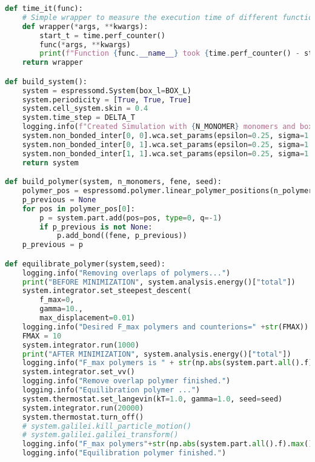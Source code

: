 \begin{lstlisting}[language=python]
def time_it(func):
	# Simple wrapper to measure the execution time of different functions.
	def wrapper(*args, **kwargs):
		start_t = time.perf_counter()
		func(*args, **kwargs)
		print(f"Function {func.__name__} took {time.perf_counter() - start_t:.2f}s to execute.")
	return wrapper

def build_system():
	system = espressomd.System(box_l=BOX_L)
	system.periodicity = [True, True, True]
	system.cell_system.skin = 0.4
	system.time_step = DELTA_T
	logging.info(f"Created Simulation with {N_MONOMER} monomers and box length L={BOX_L}.")
	system.non_bonded_inter[0, 0].wca.set_params(epsilon=0.25, sigma=1.0)
	system.non_bonded_inter[0, 1].wca.set_params(epsilon=0.25, sigma=1.0)
	system.non_bonded_inter[1, 1].wca.set_params(epsilon=0.25, sigma=1.0)
	return system

def build_polymer(system, n_monomers, fene, seed):
	polymer_pos = espressomd.polymer.linear_polymer_positions(n_polymers=1, beads_per_chain=n_monomers, seed=seed, bond_length=0.91, min_distance=0.9, start_positions=np.expand_dims(BOX_L/2., 0))
	p_previous = None
	for pos in polymer_pos[0]:
		p = system.part.add(pos=pos, type=0, q=-1)
		if p_previous is not None:
			p.add_bond((fene, p_previous))
	p_previous = p

def equilibrate_polymer(system,seed):
	logging.info("Removing overlaps of polymers...")
	print("BEFORE MINIMIZATION", system.analysis.energy()["total"])
	system.integrator.set_steepest_descent(
		f_max=0,
		gamma=10.,
		max_displacement=0.01)
	logging.info("Desired F_max polymers and counterions=" +str(FMAX))
	FMAX = 10
	system.integrator.run(1000)
	print("AFTER MINIMIZATION", system.analysis.energy()["total"])
	logging.info("F_max polymers is " + str(np.abs(system.part.all().f).max()))
	system.integrator.set_vv()
	logging.info("Remove overlap polymer finished.")
	logging.info("Equilibration polymer ...")
	system.thermostat.set_langevin(kT=1.0, gamma=1.0, seed=seed)
	system.integrator.run(20000)
	system.thermostat.turn_off()
	# system.galilei.kill_particle_motion()
	# system.galilei.galilei_transform()
	logging.info("F_max polymers"+str(np.abs(system.part.all().f).max()))
	logging.info("Equilibration polymer finished.")


\end{lstlisting}
